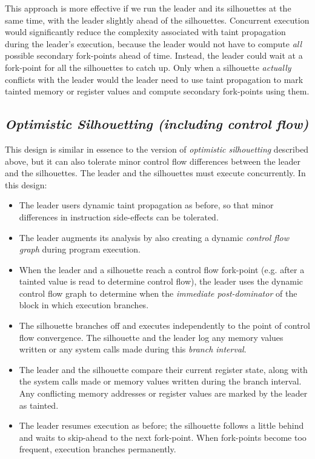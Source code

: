 This approach is more effective if we
run the leader and its silhouettes
at the same time, with the leader
slightly ahead of the silhouettes.
Concurrent execution would significantly reduce
the complexity associated with taint propagation
during the leader's execution,
because the leader would
not have to compute
{\em all} possible secondary fork-points
ahead of time.
Instead, the leader could wait at 
a fork-point for all the silhouettes
to catch up. Only when a silhouette
{\em actually} conflicts with the leader would
the leader need to use taint propagation
to mark tainted memory or register values and
compute secondary fork-points using them.

\subsection{\em Optimistic Silhouetting (including control flow)}\label{opt:sil}
This design is similar in essence to the version of {\em optimistic silhouetting}  
described above, but it can also tolerate minor control flow
differences between the leader and the silhouettes. The leader and the
silhouettes must execute concurrently. In this design:

\begin{itemize}

\item The leader users dynamic taint propagation as before,
  so that minor differences in instruction side-effects
  can be tolerated.

\item The leader augments its analysis by also
  creating a dynamic {\em control flow graph}
  during program execution.

\item When the leader and a silhouette reach a
  control flow fork-point (e.g. after a tainted value
  is read to determine control flow), the
  leader uses the dynamic control flow
  graph to determine when the {\em immediate post-dominator}
  of the block in which execution branches.

\item 
  The silhouette branches off 
  and executes independently to the 
  point of control flow convergence.
  The silhouette and the leader log
  any memory values written 
  or any system calls made
  during this {\em branch interval}.

\item 
  The leader and the silhouette
  compare their current register state, along with the system calls made
  or memory values written during the branch interval. 
  Any conflicting memory addresses 
  or register values are
  marked by the leader as tainted.

\item The leader resumes
  execution as before; the silhouette
  follows a little behind 
  and waits to skip-ahead to the next fork-point.
  When fork-points become too frequent,
  execution branches permanently.

\end{itemize}

